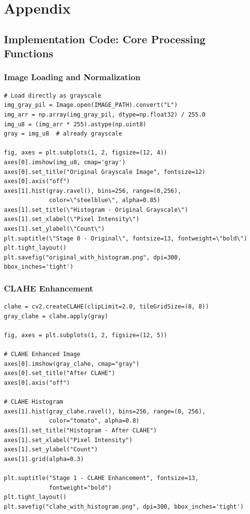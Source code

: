 \documentclass[12pt,a4paper]{article}
\begin{document}
\newpage

\section{Appendix}

\subsection{Implementation Code: Core Processing Functions}

\subsubsection{Image Loading and Normalization}

\begin{lstlisting}
# Load directly as grayscale
img_gray_pil = Image.open(IMAGE_PATH).convert("L")
img_arr = np.array(img_gray_pil, dtype=np.float32) / 255.0
img_u8 = (img_arr * 255).astype(np.uint8)
gray = img_u8  # already grayscale

fig, axes = plt.subplots(1, 2, figsize=(12, 4))
axes[0].imshow(img_u8, cmap='gray')
axes[0].set_title("Original Grayscale Image", fontsize=12)
axes[0].axis("off")
axes[1].hist(gray.ravel(), bins=256, range=(0,256), 
             color=\"steelblue\", alpha=0.85)
axes[1].set_title(\"Histogram - Original Grayscale\")
axes[1].set_xlabel(\"Pixel Intensity\")
axes[1].set_ylabel(\"Count\")
plt.suptitle(\"Stage 0 - Original\", fontsize=13, fontweight=\"bold\")
plt.tight_layout()
plt.savefig("original_with_histogram.png", dpi=300, bbox_inches='tight')
\end{lstlisting}

\subsubsection{CLAHE Enhancement}

\begin{lstlisting}
clahe = cv2.createCLAHE(clipLimit=2.0, tileGridSize=(8, 8))
gray_clahe = clahe.apply(gray)

fig, axes = plt.subplots(1, 2, figsize=(12, 5))

# CLAHE Enhanced Image
axes[0].imshow(gray_clahe, cmap="gray")
axes[0].set_title("After CLAHE")
axes[0].axis("off")

# CLAHE Histogram
axes[1].hist(gray_clahe.ravel(), bins=256, range=(0, 256),
             color="tomato", alpha=0.8)
axes[1].set_title("Histogram - After CLAHE")
axes[1].set_xlabel("Pixel Intensity")
axes[1].set_ylabel("Count")
axes[1].grid(alpha=0.3)

plt.suptitle("Stage 1 - CLAHE Enhancement", fontsize=13, 
             fontweight="bold")
plt.tight_layout()
plt.savefig("clahe_with_histogram.png", dpi=300, bbox_inches='tight')
\end{lstlisting}
\end{document}
